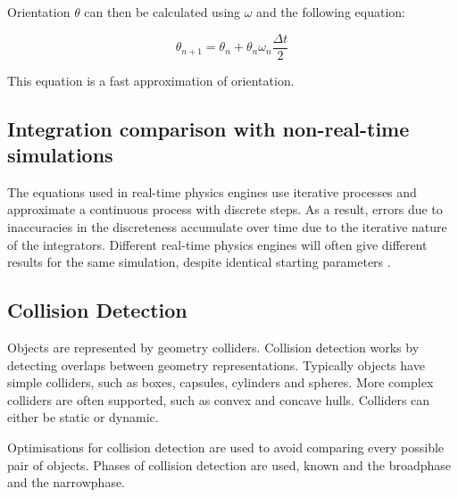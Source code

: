Orientation $\theta$ can then be calculated using $\omega$ and the following equation:

\begin{equation}
\theta_{n+1}=\theta_n+\theta_n\omega_n\frac{\Delta t}{2}
\end{equation}

This equation is a fast approximation of orientation.

\subsection{Integration comparison with non-real-time simulations}
The equations used in real-time physics engines use iterative processes and approximate a continuous process with discrete steps. As a result, errors due to inaccuracies in the discreteness accumulate over time due to the iterative nature of the integrators. Different real-time physics engines will often give different results for the same simulation, despite identical starting parameters \cite{Boeing2007}.

\subsection{Collision Detection}
Objects are represented by geometry colliders. Collision detection works by detecting overlaps between geometry representations.
Typically objects have simple colliders, such as boxes, capsules, cylinders and spheres. More complex colliders are often supported, such as convex and concave hulls. Colliders can either be static or dynamic.

Optimisations for collision detection are used to avoid comparing every possible pair of objects. Phases of collision detection are used, known and the broadphase and the narrowphase.






